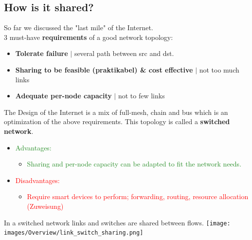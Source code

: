 \documentclass[a4paper, fontsize=8pt, landscape, DIV=1]{scrartcl}
\begin{document}
\begin{multicols*}{4}
		\subsection{How is it shared?}
		So far we discussed the "last mile" of the Internet.\\
		3 must-have \textbf{requirements} of a good network topology: 
		\begin{itemize}
			\item \textbf{Tolerate failure} $\vert$ several path between src and dst.
			\item \textbf{Sharing to be feasible (praktikabel) \& cost effective }
			$\vert$ not too much links 
			\item \textbf{Adequate per-node capacity} $\vert$ not to few links 
		\end{itemize}
		The Design of the Internet is a mix of full-mesh, chain and bus which is an
		optimization of the above requirements. This topology is called a
		\textbf{switched network}.
		\vspace{-0.5cm}
		\begin{itemize}[noitemsep,topsep=0pt]
			\item \textcolor{ForestGreen}{Advantages:}
			\begin{itemize}
				\item \textcolor{ForestGreen}{Sharing and per-node capacity can be adapted
					to fit the network needs.}
			\end{itemize} 
			\item \textcolor{Red}{Disadvantages:}
			\begin{itemize}
				\item \textcolor{Red}{Require smart devices to perform; forwarding,
					routing, resource allocation (Zuweisung) }
			\end{itemize} 
		\end{itemize} 
		In a switched network links and switches are shared between flows.
		\texttt{[image: images/Overview/link\_switch\_sharing.png]}
		\columnbreak
		

\end{multicols*}
\end{document}
